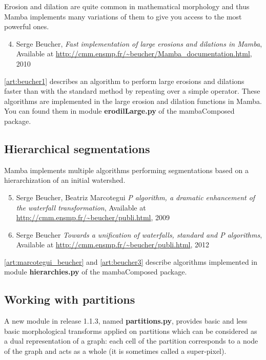 \documentclass[a4paper,10pt,oneside]{article}
\begin{document}
Erosion and dilation are quite common in mathematical morphology and thus Mamba
implements many variations of them to give you access to the most powerful ones.

\begin{enumerate}
\setcounter{enumi}{3}
\item \label{art:beucher1} Serge Beucher,
\emph{Fast implementation of large erosions and dilations in Mamba},
Available at \url{http://cmm.ensmp.fr/\~beucher/Mamba\_documentation.html}, 2010
\end{enumerate}

\ref{art:beucher1} describes an algorithm to perform large erosions and
dilations faster than with the standard method by repeating over a simple
operator. These algorithms are implemented in the large erosion and dilation
functions in Mamba. You can found them in module \textbf{erodilLarge.py} of
the mambaComposed package.

\subsection{Hierarchical segmentations}
\label{cha:hierar_seg}

Mamba implements multiple algorithms performing segmentations based on
a hierarchization of an initial watershed.

\begin{enumerate}
\setcounter{enumi}{4}
\item \label{art:marcotegui_beucher} Serge Beucher, Beatriz Marcotegui
\emph{P algorithm, a dramatic enhancement of the waterfall transformation},
Available at \url{http://cmm.ensmp.fr/~beucher/publi.html}, 2009

\item \label{art:beucher3} Serge Beucher
\emph{Towards a unification of waterfalls, standard and P algorithms},
Available at \url{http://cmm.ensmp.fr/~beucher/publi.html}, 2012
\end{enumerate}

\ref{art:marcotegui_beucher} and \ref{art:beucher3} describe algorithms
implemented in module \textbf{hierarchies.py} of the mambaComposed package.

\subsection{Working with partitions}
\label{cha:partitions}

A new module in release 1.1.3, named \textbf{partitions.py}, provides basic and less basic
morphological transforms applied on partitions which can be considered as a dual representation
of a graph: each cell of the partition corresponds to a node of the graph and acts as a whole
(it is sometimes called a super-pixel).
\end{document}
